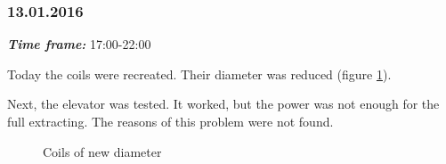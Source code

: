 \subsubsection{13.01.2016}
\textit{\textbf{Time frame:}} 17:00-22:00 

Today the coils were recreated. Their diameter was reduced (figure \ref{Winch2.11}).

Next, the elevator was tested. It worked, but the power was not enough for the full extracting. The reasons of this problem were not found.

\begin{figure}[H]
	\begin{minipage}[h]{1\linewidth}
		\caption{Coils of new diameter}
		\label{Winch2.11}
	\end{minipage}
\end{figure}
